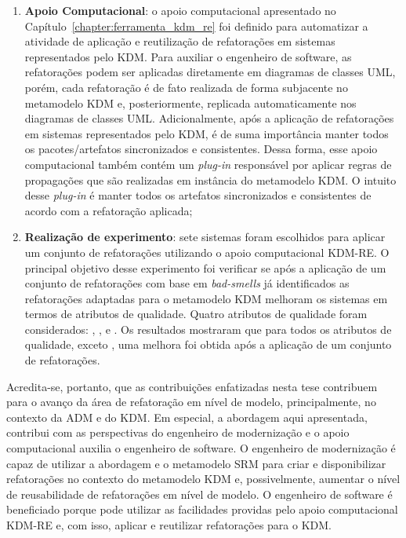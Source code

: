 \begin{enumerate}
\item \textbf{Apoio Computacional}: o apoio computacional apresentado no Capítulo~\ref{chapter:ferramenta_kdm_re} foi definido para automatizar a atividade de aplicação e reutilização de refatorações em sistemas representados pelo KDM. Para auxiliar o engenheiro de software, as refatorações podem ser aplicadas diretamente em diagramas de classes UML, porém, cada refatoração é de fato realizada de forma subjacente no metamodelo KDM e, posteriormente, replicada automaticamente nos diagramas de classes UML. Adicionalmente, após a aplicação de refatorações em sistemas representados pelo KDM, é de suma importância manter todos os pacotes/artefatos sincronizados e consistentes. Dessa forma, esse apoio computacional também contém um \textit{plug-in} responsável por aplicar regras de propagações que são realizadas em instância do metamodelo KDM. O intuito desse \textit{plug-in} é manter todos os artefatos sincronizados e consistentes de acordo com a refatoração aplicada;

\item \textbf{Realização de experimento}: sete sistemas foram escolhidos para aplicar um conjunto de refatorações utilizando o apoio computacional KDM-RE. O principal objetivo desse experimento foi verificar se após a aplicação de um conjunto de refatorações com base em \textit{bad-smells} já identificados as refatorações adaptadas para o metamodelo KDM melhoram os sistemas em termos de atributos de qualidade. Quatro atributos de qualidade foram considerados: , ,  e . Os resultados mostraram que para todos os atributos de qualidade, exceto , uma melhora foi obtida após a aplicação de um conjunto de refatorações.

\end{enumerate}

Acredita-se, portanto, que as contribuições enfatizadas nesta tese contribuem para o avanço da área de refatoração em nível de modelo, principalmente, no contexto da ADM e do KDM. Em especial, a abordagem aqui apresentada, contribui com as perspectivas do engenheiro de modernização e o apoio computacional auxilia o engenheiro de software. O engenheiro de modernização é capaz de utilizar a abordagem e o metamodelo SRM para criar e disponibilizar refatorações no contexto do metamodelo KDM e, possivelmente, aumentar o nível de reusabilidade de refatorações em nível de modelo. O engenheiro de software é beneficiado porque pode utilizar as facilidades providas pelo apoio computacional KDM-RE e, com isso, aplicar e reutilizar refatorações para o KDM.


